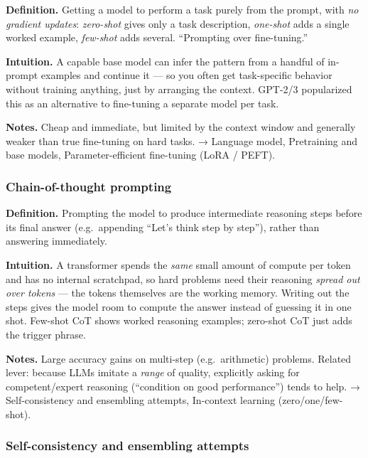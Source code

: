 \documentclass[
  10pt,
  letterpaper,
  onecolumn]{article}
\begin{document}
\textbf{Definition.} Getting a model to perform a task purely from the
prompt, with \emph{no gradient updates}: \emph{zero-shot} gives only a
task description, \emph{one-shot} adds a single worked example,
\emph{few-shot} adds several. ``Prompting over fine-tuning.''

\textbf{Intuition.} A capable base model can infer the pattern from a
handful of in-prompt examples and continue it --- so you often get
task-specific behavior without training anything, just by arranging the
context. GPT-2/3 popularized this as an alternative to fine-tuning a
separate model per task.

\textbf{Notes.} Cheap and immediate, but limited by the context window
and generally weaker than true fine-tuning on hard tasks. → Language
model, Pretraining and base models, Parameter-efficient fine-tuning
(LoRA / PEFT).

\hypertarget{chain-of-thought-prompting}{%
\subsubsection{Chain-of-thought
prompting}\label{chain-of-thought-prompting}}

\textbf{Definition.} Prompting the model to produce intermediate
reasoning steps before its final answer (e.g.~appending ``Let's think
step by step''), rather than answering immediately.

\textbf{Intuition.} A transformer spends the \emph{same} small amount of
compute per token and has no internal scratchpad, so hard problems need
their reasoning \emph{spread out over tokens} --- the tokens themselves
are the working memory. Writing out the steps gives the model room to
compute the answer instead of guessing it in one shot. Few-shot CoT
shows worked reasoning examples; zero-shot CoT just adds the trigger
phrase.

\textbf{Notes.} Large accuracy gains on multi-step (e.g.~arithmetic)
problems. Related lever: because LLMs imitate a \emph{range} of quality,
explicitly asking for competent/expert reasoning (``condition on good
performance'') tends to help. → Self-consistency and ensembling
attempts, In-context learning (zero/one/few-shot).

\hypertarget{self-consistency-and-ensembling-attempts}{%
\subsubsection{Self-consistency and ensembling
attempts}\label{self-consistency-and-ensembling-attempts}}
\end{document}
